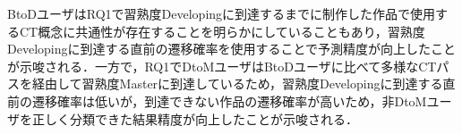 \documentclass[submit]{ipsj}
\begin{document}
BtoDユーザはRQ1で習熟度Developingに到達するまでに制作した作品で使用するCT概念に共通性が存在することを明らかにしていることもあり，習熟度Developingに到達する直前の遷移確率を使用することで予測精度が向上したことが示唆される．一方で，RQ1でDtoMユーザはBtoDユーザに比べて多様なCTパスを経由して習熟度Masterに到達しているため，習熟度Developingに到達する直前の遷移確率は低いが，到達できない作品の遷移確率が高いため，非DtoMユーザを正しく分類できた結果精度が向上したことが示唆される．





\end{document}
